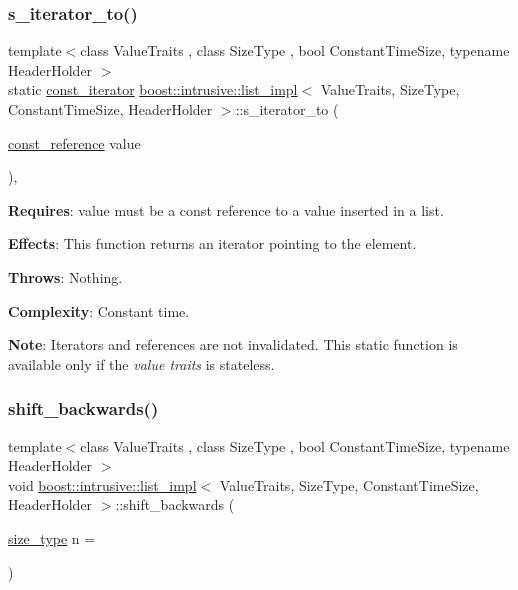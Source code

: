 \subsubsection{\texorpdfstring{s\+\_\+iterator\+\_\+to()}{s\_iterator\_to()}\hspace{0.1cm}{\footnotesize\ttfamily [2/2]}}
{\footnotesize\ttfamily template$<$class Value\+Traits , class Size\+Type , bool Constant\+Time\+Size, typename Header\+Holder $>$ \\
static \hyperlink{classboost_1_1intrusive_1_1list__impl_af4ced710fe02662c5650d161af83d8cd}{const\+\_\+iterator} \hyperlink{classboost_1_1intrusive_1_1list__impl}{boost\+::intrusive\+::list\+\_\+impl}$<$ Value\+Traits, Size\+Type, Constant\+Time\+Size, Header\+Holder $>$\+::s\+\_\+iterator\+\_\+to (\begin{DoxyParamCaption}\item[{\hyperlink{classboost_1_1intrusive_1_1list__impl_a3d37629151c76fb8389ac3ba3b359201}{const\+\_\+reference}}]{value }\end{DoxyParamCaption})\hspace{0.3cm}{\ttfamily [inline]}, {\ttfamily [static]}}

{\bfseries Requires}\+: value must be a const reference to a value inserted in a list.

{\bfseries Effects}\+: This function returns an iterator pointing to the element.

{\bfseries Throws}\+: Nothing.

{\bfseries Complexity}\+: Constant time.

{\bfseries Note}\+: Iterators and references are not invalidated. This static function is available only if the {\itshape value traits} is stateless. \mbox{\label{classboost_1_1intrusive_1_1list__impl_a7b0d4d3142d0243ea881a0be968bdb14}} 
\subsubsection{\texorpdfstring{shift\+\_\+backwards()}{shift\_backwards()}}
{\footnotesize\ttfamily template$<$class Value\+Traits , class Size\+Type , bool Constant\+Time\+Size, typename Header\+Holder $>$ \\
void \hyperlink{classboost_1_1intrusive_1_1list__impl}{boost\+::intrusive\+::list\+\_\+impl}$<$ Value\+Traits, Size\+Type, Constant\+Time\+Size, Header\+Holder $>$\+::shift\+\_\+backwards (\begin{DoxyParamCaption}\item[{\hyperlink{classboost_1_1intrusive_1_1list__impl_a3e340b93081e392fba09de7145fb5733}{size\+\_\+type}}]{n = {} }\end{DoxyParamCaption})\hspace{0.3cm}{\ttfamily [inline]}}

